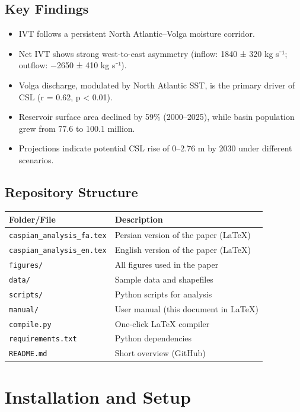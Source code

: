 \documentclass[12pt,a4paper]{article}
\begin{document}
\subsection{Key Findings}
\begin{itemize}
    \item IVT follows a persistent North Atlantic--Volga moisture corridor.
    \item Net IVT shows strong west-to-east asymmetry (inflow: 1840 ± 320 kg s⁻¹; outflow: −2650 ± 410 kg s⁻¹).
    \item Volga discharge, modulated by North Atlantic SST, is the primary driver of CSL (r = 0.62, p < 0.01).
    \item Reservoir surface area declined by 59\% (2000--2025), while basin population grew from 77.6 to 100.1 million.
    \item Projections indicate potential CSL rise of 0--2.76 m by 2030 under different scenarios.
\end{itemize}

\subsection{Repository Structure}
\begin{longtable}{p{4cm} p{10cm}}
\toprule
\textbf{Folder/File} & \textbf{Description} \\
\midrule
\texttt{caspian\_analysis\_fa.tex} & Persian version of the paper (LaTeX) \\
\texttt{caspian\_analysis\_en.tex} & English version of the paper (LaTeX) \\
\texttt{figures/} & All figures used in the paper \\
\texttt{data/} & Sample data and shapefiles \\
\texttt{scripts/} & Python scripts for analysis \\
\texttt{manual/} & User manual (this document in LaTeX) \\
\texttt{compile.py} & One-click LaTeX compiler \\
\texttt{requirements.txt} & Python dependencies \\
\texttt{README.md} & Short overview (GitHub) \\
\bottomrule
\end{longtable}

\section{Installation and Setup}
\end{document}
